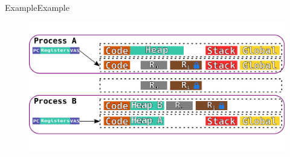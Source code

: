\documentclass[10pt]{beamer}
\begin{document}
\begin{frame}{Example}{Example}
  \begin{figure}[ht]
    \centering
    \includegraphics[width=1\textwidth, keepaspectratio=true]{images/spacejmp_example_n.png}
  \end{figure}
\end{frame}

{\1
\begin{frame}

\end{frame}}
\end{document}
